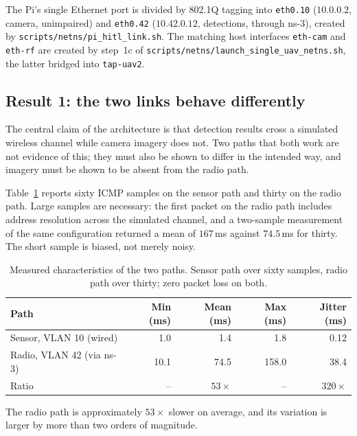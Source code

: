 The Pi's single Ethernet port is divided by 802.1Q tagging into
\texttt{eth0.10} ($10.0.0.2$, camera, unimpaired) and \texttt{eth0.42}
($10.42.0.12$, detections, through ns-3), created by
\texttt{scripts/netns/pi\_hitl\_link.sh}. The matching host interfaces
\texttt{eth-cam} and \texttt{eth-rf} are created by step~1c of
\texttt{scripts/netns/launch\_single\_uav\_netns.sh}, the latter bridged
into \texttt{tap-uav2}.

\subsection{Result 1: the two links behave differently}
\label{sec:test-links}

The central claim of the architecture is that detection results cross a
simulated wireless channel while camera imagery does not. Two paths that
both work are not evidence of this; they must also be shown to differ in the
intended way, and imagery must be shown to be absent from the radio path.

Table~\ref{tab:test-links} reports sixty ICMP samples on the sensor path and
thirty on the radio path. Large samples are necessary: the first packet on the
radio path includes address resolution across the simulated channel, and a
two-sample measurement of the same configuration returned a mean of
$167$\,ms against $74.5$\,ms for thirty. The short sample is biased, not
merely noisy.

\begin{table}[htbp]
\centering
\caption{Measured characteristics of the two paths. Sensor path over sixty
samples, radio path over thirty; zero packet loss on both.}
\label{tab:test-links}
\begin{tabular}{@{}lrrrr@{}}
\toprule
Path & Min (ms) & Mean (ms) & Max (ms) & Jitter (ms) \\
\midrule
Sensor, VLAN 10 (wired)   & 1.0  & 1.4  & 1.8   & 0.12 \\
Radio, VLAN 42 (via ns-3) & 10.1 & 74.5 & 158.0 & 38.4 \\
\midrule
Ratio                     & --   & $53\times$ & -- & $320\times$ \\
\bottomrule
\end{tabular}
\end{table}

The radio path is approximately \(53\times\) slower on average, and its
variation is larger by more than two orders of magnitude.

